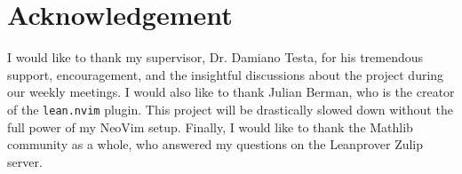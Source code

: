 \section{Acknowledgement}

I would like to thank my supervisor, Dr. Damiano Testa, for his tremendous support, encouragement, and the insightful discussions about the project during our weekly meetings. I would also like to thank Julian Berman, who is the creator of the \texttt{lean.nvim} plugin. This project will be drastically slowed down without the full power of my NeoVim setup. Finally, I would like to thank the Mathlib community as a whole, who answered my questions on the Leanprover Zulip server.
